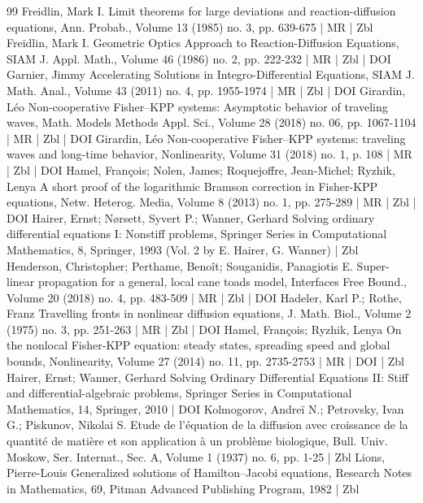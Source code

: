 \documentclass[10pt]{amsart}
\theoremstyle{definition}\newtheorem{defi}[theo]{Definition}\newtheorem{rema}[theo]{Remark}\newtheorem{exam}[theo]{Example}\newtheorem{exem}[theo]{Example}\newtheorem{nota}[theo]{Notation}
\newcommand{\1}{\mathds{1}}
\begin{document}
\begin{thebibliography}{99}
Freidlin, Mark I. Limit theorems for large deviations and reaction-diffusion equations, Ann. Probab., Volume 13 (1985) no. 3, pp. 639-675 | MR | Zbl
Freidlin, Mark I. Geometric Optics Approach to Reaction-Diffusion Equations, SIAM J. Appl. Math., Volume 46 (1986) no. 2, pp. 222-232 | MR | Zbl | DOI
Garnier, Jimmy Accelerating Solutions in Integro-Differential Equations, SIAM J. Math. Anal., Volume 43 (2011) no. 4, pp. 1955-1974 | MR | Zbl | DOI
Girardin, Léo Non-cooperative Fisher–KPP systems: Asymptotic behavior of traveling waves, Math. Models Methods Appl. Sci., Volume 28 (2018) no. 06, pp. 1067-1104 | MR | Zbl | DOI
Girardin, Léo Non-cooperative Fisher–KPP systems: traveling waves and long-time behavior, Nonlinearity, Volume 31 (2018) no. 1, p. 108 | MR | Zbl | DOI
Hamel, François; Nolen, James; Roquejoffre, Jean-Michel; Ryzhik, Lenya A short proof of the logarithmic Bramson correction in Fisher-KPP equations, Netw. Heterog. Media, Volume 8 (2013) no. 1, pp. 275-289 | MR | Zbl | DOI
Hairer, Ernst; Nørsett, Syvert P.; Wanner, Gerhard Solving ordinary differential equations I: Nonstiff problems, Springer Series in Computational Mathematics, 8, Springer, 1993 (Vol. 2 by E. Hairer, G. Wanner) | Zbl
Henderson, Christopher; Perthame, Benoît; Souganidis, Panagiotis E. Super-linear propagation for a general, local cane toads model, Interfaces Free Bound., Volume 20 (2018) no. 4, pp. 483-509 | MR | Zbl | DOI
Hadeler, Karl P.; Rothe, Franz Travelling fronts in nonlinear diffusion equations, J. Math. Biol., Volume 2 (1975) no. 3, pp. 251-263 | MR | Zbl | DOI
Hamel, François; Ryzhik, Lenya On the nonlocal Fisher-KPP equation: steady states, spreading speed and global bounds, Nonlinearity, Volume 27 (2014) no. 11, pp. 2735-2753 | MR | DOI | Zbl
Hairer, Ernst; Wanner, Gerhard Solving Ordinary Differential Equations II: Stiff and differential-algebraic problems, Springer Series in Computational Mathematics, 14, Springer, 2010 | DOI
Kolmogorov, Andreï N.; Petrovsky, Ivan G.; Piskunov, Nikolai S. Etude de l’équation de la diffusion avec croissance de la quantité de matière et son application à un problème biologique, Bull. Univ. Moskow, Ser. Internat., Sec. A, Volume 1 (1937) no. 6, pp. 1-25 | Zbl
Lions, Pierre-Louis Generalized solutions of Hamilton–Jacobi equations, Research Notes in Mathematics, 69, Pitman Advanced Publishing Program, 1982 | Zbl

\end{thebibliography}
\end{document}
